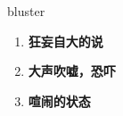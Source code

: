 
\begin{frame}
{\huge bluster}
\begin{center}
\begin{enumerate}\Large
  \item \textbf{狂妄自大的说}
  \item \textbf{大声吹嘘，恐吓}
  \item \textbf{喧闹的状态}
\end{enumerate}
\end{center}
\end{frame}
